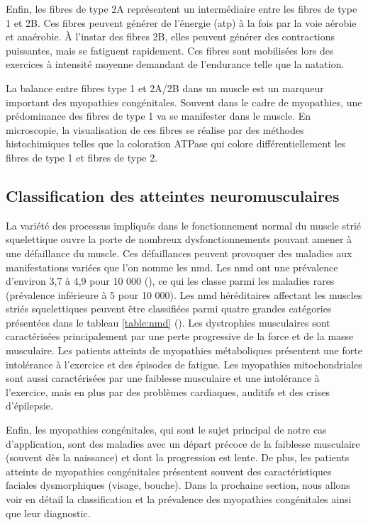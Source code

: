 Enfin, les fibres de type 2A représentent un intermédiaire entre les fibres de type 1 et 2B. Ces fibres peuvent générer de l'énergie (\gls{atp}) à la fois par la voie aérobie et anaérobie. À l'instar des fibres 2B, elles peuvent générer des contractions puissantes, mais se fatiguent rapidement. Ces fibres sont mobilisées lors des exercices à intensité moyenne demandant de l'endurance telle que la natation.

La balance entre fibres type 1 et 2A/2B dans un muscle est un marqueur important des myopathies congénitales. Souvent dans le cadre de myopathies, une prédominance des fibres de type 1 va se manifester dans le muscle. En microscopie, la visualisation de ces fibres se réalise par des méthodes histochimiques telles que la coloration ATPase qui colore différentiellement les fibres de type 1 et fibres de type 2. 

\subsection{Classification des atteintes neuromusculaires}
La variété des processus impliqués dans le fonctionnement normal du muscle strié squelettique ouvre la porte de nombreux dysfonctionnements pouvant amener à une défaillance du muscle. Ces défaillances peuvent provoquer des maladies aux manifestations variées que l'on nomme les \gls{nmd}. Les \gls{nmd} ont une prévalence d'environ 3,7 à 4,9 pour 10 000 (\cite{lace_overview_2022}), ce qui les classe parmi les maladies rares (prévalence inférieure à 5 pour 10 000). Les \gls{nmd} héréditaires affectant les muscles striés squelettiques peuvent être classifiées parmi quatre grandes catégories présentées dans le tableau \ref{table:nmd} (\cite{lornage_identification_2019, benarroch_2023_2023}). Les dystrophies musculaires sont caractérisées principalement par une perte progressive de la force et de la masse musculaire. Les patients atteints de myopathies métaboliques présentent une forte intolérance à l'exercice et des épisodes de fatigue. Les myopathies mitochondriales sont aussi caractérisées par une faiblesse musculaire et une intolérance à l'exercice, mais en plus par des problèmes cardiaques, auditifs et des crises d'épilepsie.

Enfin, les myopathies congénitales, qui sont le sujet principal de notre cas d'application, sont des maladies avec un départ précoce de la faiblesse musculaire (souvent dès la naissance) et dont la progression est lente. De plus, les patients atteints de myopathies congénitales présentent souvent des caractéristiques faciales dysmorphiques (visage, bouche). Dans la prochaine section, nous allons voir en détail la classification et la prévalence des myopathies congénitales ainsi que leur diagnostic.

